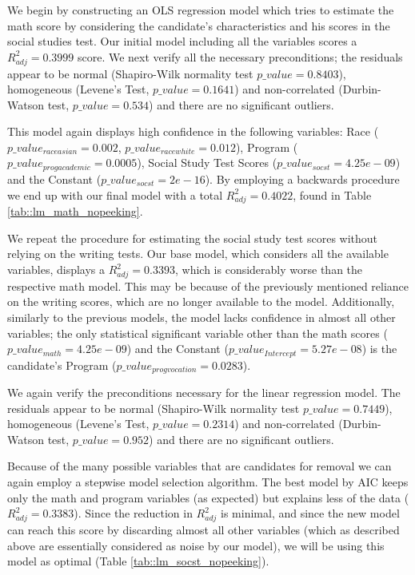 \documentclass[10pt]{article}
\begin{document}
	We begin by constructing an OLS regression model which tries to estimate the math score by considering the candidate's characteristics and his scores in the social studies test. Our initial model including all the variables scores a $R^2_{adj} = 0.3999$ score. We next verify all the necessary preconditions; the residuals appear to be normal (Shapiro-Wilk normality test $p\_value = 0.8403$), homogeneous (Levene's Test, $p\_value = 0.1641$) and non-correlated (Durbin-Watson test, $p\_value=0.534$) and there are no significant outliers. 
	
	This model again displays high confidence in the following variables: Race ($p\_value_{raceasian} = 0.002$, $p\_value_{racewhite} = 0.012$), Program ($p\_value_{progacademic} = 0.0005$), Social Study Test Scores ($p\_value_{socst} = 4.25e-09$) and the Constant ($p\_value_{socst} = 2e-16$). By employing a backwards procedure we end up with our final model with a total $R^2_{adj} = 0.4022$, found in Table \ref{tab::lm_math_nopeeking}.
	
	We repeat the procedure for estimating the social study test scores without relying on the writing tests. Our base model, which considers all the available variables, displays a $R^2_{adj} = 0.3393$, which is considerably worse than the respective math model. This may be because of the previously mentioned reliance on the writing scores, which are no longer available to the model. Additionally, similarly to the previous models, the model lacks confidence in almost all other variables; the only statistical significant variable other than the math scores ($p\_value_{math} = 4.25e-09$) and the Constant ($p\_value_{Intercept} = 5.27e-08$) is the candidate's Program ($p\_value_{progvocation} = 0.0283$).
	
	We again verify the preconditions necessary for the linear regression model. The residuals appear to be normal (Shapiro-Wilk normality test $p\_value = 0.7449$), homogeneous (Levene's Test, $p\_value = 0.2314$) and non-correlated (Durbin-Watson test, $p\_value=0.952$) and there are no significant outliers.
	
	Because of the many possible variables that are candidates for removal we can again employ a stepwise model selection algorithm. The best model by AIC keeps only the math and program variables (as expected) but explains less of the data ($R^2_{adj} = 0.3383$). Since the reduction in $R^2_{adj}$ is minimal, and since the new model can reach this score by discarding almost all other variables (which as described above are essentially considered as noise by our model), we will be using this model as optimal (Table \ref{tab::lm_socst_nopeeking}).
	
\end{document}
